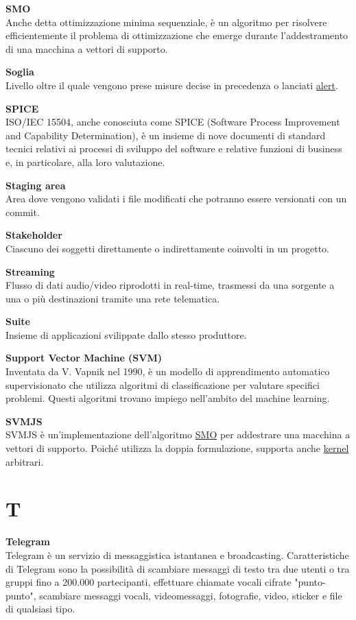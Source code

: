 \documentclass[a4paper, oneside, openany, dvipsnames, table, 12pt]{article}
\begin{document}
\label{par:SMO}
\textbf{SMO} \\
Anche detta ottimizzazione minima sequenziale, è un algoritmo per risolvere efficientemente il problema di ottimizzazione che emerge durante l'addestramento di una macchina a vettori di supporto.

\textbf{Soglia} \\
Livello oltre il quale vengono prese misure decise in precedenza o lanciati \hyperref[par:alert]{alert\glo}.

\textbf{SPICE} \\
ISO/IEC 15504, anche conosciuta come SPICE (Software Process Improvement and Capability Determination), è un insieme di nove documenti di standard tecnici relativi ai processi di sviluppo del software e relative funzioni di business e, in particolare, alla loro valutazione.

\textbf{Staging area} \\
Area dove vengono validati i file modificati che potranno essere versionati con un commit\glo.

\textbf{Stakeholder} \\
Ciascuno dei soggetti direttamente o indirettamente coinvolti in un progetto.

\textbf{Streaming} \\
Flusso di dati audio/video riprodotti in real-time, trasmessi da una sorgente a una o più destinazioni tramite una rete telematica.

\textbf{Suite} \\
Insieme di applicazioni svilippate dallo stesso produttore.

\textbf{Support Vector Machine (SVM)} \\
Inventata da V. Vapnik nel 1990, è un modello di apprendimento automatico supervisionato che utilizza algoritmi di classificazione per valutare specifici problemi. Questi algoritmi trovano impiego nell'ambito del machine learning.

\textbf{SVMJS} \\
SVMJS è un'implementazione dell'algoritmo \hyperref[par:SMO]{SMO\glo} per addestrare una macchina a vettori di supporto. Poiché utilizza la doppia formulazione, supporta anche \hyperref[par:kernel]{kernel\glo} arbitrari. 

\newpage
\section{T}
\textbf{Telegram} \\
Telegram è un servizio di messaggistica istantanea e broadcasting. Caratteristiche di Telegram sono la possibilità di scambiare messaggi di testo tra due utenti o tra gruppi fino a 200.000 partecipanti, effettuare chiamate vocali cifrate "punto-punto", scambiare messaggi vocali, videomessaggi, fotografie, video, sticker e file di qualsiasi tipo.
\end{document}
